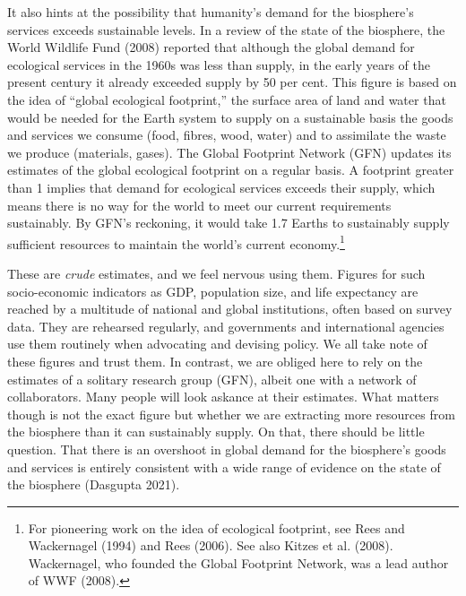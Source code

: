 \documentclass[man,11pt,a4paper,floatsintext]{apa7}
\begin{document}
It also hints at the possibility that humanity's demand for the biosphere's services exceeds sustainable levels. In a review of the state of the biosphere, the World Wildlife Fund (2008) reported that although the global demand for ecological services in the 1960s was less than supply, in the early years of the present century it already exceeded supply by 50 per cent. This figure is based on the idea of ``global ecological footprint,'' the surface area of land and water that would be needed for the Earth system to supply on a sustainable basis the goods and services we consume (food, fibres, wood, water) and to assimilate the waste we produce (materials, gases). The Global Footprint Network (GFN) updates its estimates of the global ecological footprint on a regular basis. A footprint greater than 1 implies that demand for ecological services exceeds their supply, which means there is no way for the world to meet our current requirements sustainably. By GFN's reckoning, it would take 1.7 Earths to sustainably supply sufficient resources to maintain the world's current economy.\footnote{For pioneering work on the idea of ecological footprint, see Rees and Wackernagel (1994) and Rees (2006). See also Kitzes et al. (2008). Wackernagel, who founded the Global Footprint Network, was a lead author of WWF (2008).}

These are \textit{crude} estimates, and we feel nervous using them. Figures for such socio-economic indicators as GDP, population size, and life expectancy are reached by a multitude of national and global institutions, often based on survey data. They are rehearsed regularly, and governments and international agencies use them routinely when advocating and devising policy. We all take note of these figures and trust them. In contrast, we are obliged here to rely on the estimates of a solitary research group (GFN), albeit one with a network of collaborators. Many people will look askance at their estimates. What matters though is not the exact figure but whether we are extracting more resources from the biosphere than it can sustainably supply. On that, there should be little question. That there is an overshoot in global demand for the biosphere's goods and services is entirely consistent with a wide range of evidence on the state of the biosphere (Dasgupta 2021).
\end{document}
